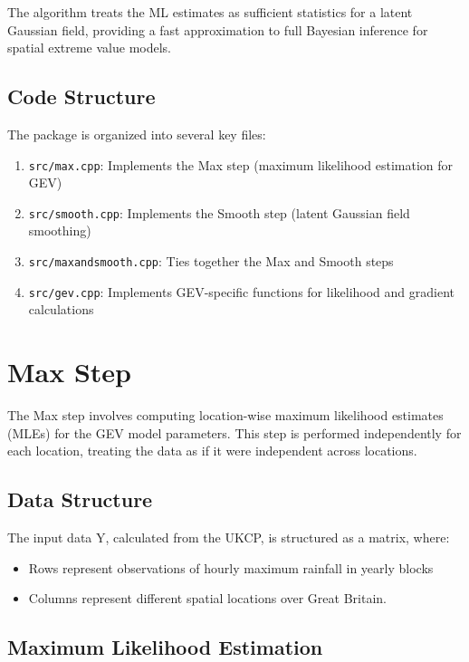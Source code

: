 \documentclass[
  letterpaper,
  DIV=11,
  numbers=noendperiod]{scrartcl}
\providecommand{\tightlist}{%
  \setlength{\itemsep}{0pt}\setlength{\parskip}{0pt}}\usepackage{longtable,booktabs,array}
\begin{document}
The algorithm treats the ML estimates as sufficient statistics for a
latent Gaussian field, providing a fast approximation to full Bayesian
inference for spatial extreme value models.

\subsection{Code Structure}\label{code-structure}

The package is organized into several key files:

\begin{enumerate}
\def\labelenumi{\arabic{enumi}.}
\tightlist
\item
  \texttt{src/max.cpp}: Implements the Max step (maximum likelihood
  estimation for GEV)
\item
  \texttt{src/smooth.cpp}: Implements the Smooth step (latent Gaussian
  field smoothing)
\item
  \texttt{src/maxandsmooth.cpp}: Ties together the Max and Smooth steps
\item
  \texttt{src/gev.cpp}: Implements GEV-specific functions for likelihood
  and gradient calculations
\end{enumerate}

\section{Max Step}\label{max-step}

The Max step involves computing location-wise maximum likelihood
estimates (MLEs) for the GEV model parameters. This step is performed
independently for each location, treating the data as if it were
independent across locations.

\subsection{Data Structure}\label{data-structure}

The input data Y, calculated from the UKCP, is structured as a matrix,
where:

\begin{itemize}
\tightlist
\item
  Rows represent observations of hourly maximum rainfall in yearly
  blocks
\item
  Columns represent different spatial locations over Great Britain.
\end{itemize}

\subsection{Maximum Likelihood
Estimation}\label{maximum-likelihood-estimation}
\end{document}
